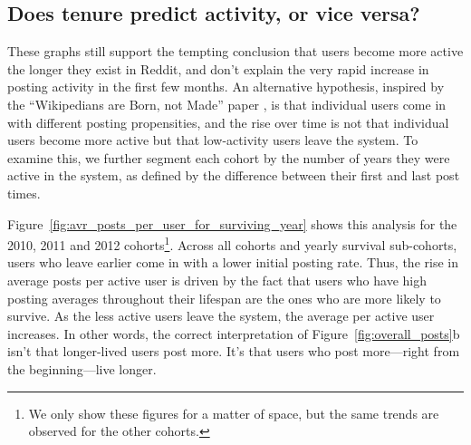 \subsection{Does tenure predict activity, or vice versa?}


These graphs still support the tempting conclusion that users become more active the longer they exist in Reddit, and don't explain the very rapid increase in posting activity in the first few months.  An alternative hypothesis, inspired by the ``Wikipedians are Born, not Made'' paper \cite{}, is that individual users come in with different posting propensities, and the rise over time is not that individual users become more active but that low-activity users leave the system.  To examine this, we further segment each cohort by the number of years they were active in the system, as defined by the difference between their first and last post times.
 
Figure~\ref{fig:avr_posts_per_user_for_surviving_year} shows this analysis for the 2010, 2011 and 2012 cohorts\footnote{We only show these figures for a matter of space, but the same trends are observed for the other cohorts.}.  Across all cohorts and yearly survival sub-cohorts, users who leave earlier come in with a lower initial posting rate.  Thus, the rise in average posts per active user is driven by the fact that users who have high posting averages throughout their lifespan are the ones who are more likely to survive.  As the less active users leave the system, the average per active user increases.  In other words, the correct interpretation of Figure~\ref{fig:overall_posts}b isn't that longer-lived users post more.  It's that users who post more---right from the beginning---live longer. 

